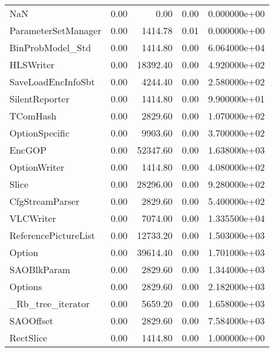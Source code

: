 \begin{tabular}{lrrrr}
NaN                       &   0.00 &      0.00 &      0.00 &  0.000000e+00 \\
ParameterSetManager       &   0.00 &   1414.78 &      0.01 &  0.000000e+00 \\
BinProbModel\_Std          &   0.00 &   1414.80 &      0.00 &  6.064000e+04 \\
HLSWriter                 &   0.00 &  18392.40 &      0.00 &  4.920000e+02 \\
SaveLoadEncInfoSbt        &   0.00 &   4244.40 &      0.00 &  2.580000e+02 \\
SilentReporter            &   0.00 &   1414.80 &      0.00 &  9.900000e+01 \\
TComHash                  &   0.00 &   2829.60 &      0.00 &  1.070000e+02 \\
OptionSpecific            &   0.00 &   9903.60 &      0.00 &  3.700000e+02 \\
EncGOP                    &   0.00 &  52347.60 &      0.00 &  1.638000e+03 \\
OptionWriter              &   0.00 &   1414.80 &      0.00 &  4.080000e+02 \\
Slice                     &   0.00 &  28296.00 &      0.00 &  9.280000e+02 \\
CfgStreamParser           &   0.00 &   2829.60 &      0.00 &  5.400000e+02 \\
VLCWriter                 &   0.00 &   7074.00 &      0.00 &  1.335500e+04 \\
ReferencePictureList      &   0.00 &  12733.20 &      0.00 &  1.503000e+03 \\
Option                    &   0.00 &  39614.40 &      0.00 &  1.701000e+03 \\
SAOBlkParam               &   0.00 &   2829.60 &      0.00 &  1.344000e+03 \\
Options                   &   0.00 &   2829.60 &      0.00 &  2.182000e+03 \\
\_Rb\_tree\_iterator         &   0.00 &   5659.20 &      0.00 &  1.658000e+03 \\
SAOOffset                 &   0.00 &   2829.60 &      0.00 &  7.584000e+03 \\
RectSlice                 &   0.00 &   1414.80 &      0.00 &  1.000000e+00 \\
\bottomrule
\end{tabular}
